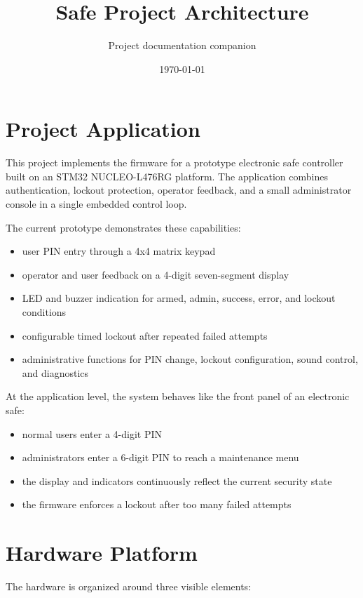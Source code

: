\documentclass[11pt,a4paper]{article}
\title{Safe Project Architecture}
\author{Project documentation companion}
\date{\today}
\begin{document}
\maketitle
\tableofcontents
\newpage

\section{Project Application}

This project implements the firmware for a prototype electronic safe controller built on an
STM32 NUCLEO-L476RG platform. The application combines authentication, lockout protection,
operator feedback, and a small administrator console in a single embedded control loop.

The current prototype demonstrates these capabilities:

\begin{itemize}[leftmargin=1.5em]
\item user PIN entry through a 4x4 matrix keypad
\item operator and user feedback on a 4-digit seven-segment display
\item LED and buzzer indication for armed, admin, success, error, and lockout conditions
\item configurable timed lockout after repeated failed attempts
\item administrative functions for PIN change, lockout configuration, sound control, and diagnostics
\end{itemize}

At the application level, the system behaves like the front panel of an electronic safe:

\begin{itemize}[leftmargin=1.5em]
\item normal users enter a 4-digit PIN
\item administrators enter a 6-digit PIN to reach a maintenance menu
\item the display and indicators continuously reflect the current security state
\item the firmware enforces a lockout after too many failed attempts
\end{itemize}

\section{Hardware Platform}

The hardware is organized around three visible elements:
\end{document}
